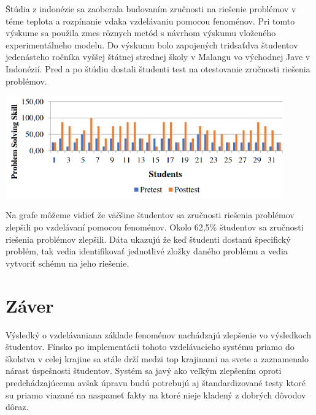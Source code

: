 \documentclass[11pt,slovak,a4paper]{article}
\begin{document}
Štúdia z indonézie \cite{Santhalia_2020} sa zaoberala budovaním zručnosti na riešenie problémov v téme teplota a rozpínanie vdaka vzdelávaniu pomocou fenoménov.
Pri tomto výskume sa použila zmes rôznych metód s návrhom výskumu vloženého experimentálneho modelu. Do výskumu bolo zapojených tridsaťdva študentov
jedenásteho ročníka vyššej štátnej strednej školy v Malangu vo východnej Jave v Indonézií. Pred a po štúdiu dostali študenti test na otestovanie zručnosti riešenia problémov.

\includegraphics [width=0.9\textwidth] {graph.png}

Na grafe môžeme vidieť že väčšine študentov sa zručnosti riešenia problémov zlepšili po vzdelávaní pomocou fenoménov. Okolo 62,5\% študentov sa zručnosti riešenia problémov zlepšili.
Dáta ukazujú že keď študenti dostanú špecifický problém, tak vedia identifikovať jednotlivé zložky daného problému a vedia vytvoriť schému na jeho riešenie.


\section{Záver}

Výsledký o vzdelávaniana základe fenoménov nachádzajú zlepšenie vo výsledkoch študentov. Fínsko po implementácii
tohoto vzdelávacieho systému priamo do školstva v celej krajine sa stále drží medzi top krajinami na svete a zaznamenalo 
nárast úspešnosti študentov. Systém sa javý ako veľkým zlepšením oproti predchádzajúcemu avšak úpravu budú potrebujú aj
štandardizované testy ktoré su priamo viazané na naspameť fakty na ktoré nieje kladený z dobrých dôvodov dôraz.
\cite{pblf}



\end{document}
